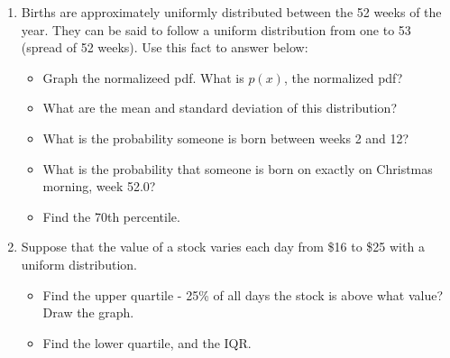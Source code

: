 \documentclass{article}
\begin{document}
\begin{enumerate}
\item Births are approximately uniformly distributed between the 52 weeks of the year. They can be said to follow a uniform
distribution from one to 53 (spread of 52 weeks).  Use this fact to answer below:
\begin{itemize}
\item Graph the normalizeed pdf. What is $p(x)$, the normalized pdf? \\ \vspace{1.5cm}
\item What are the mean and standard deviation of this distribution? \\ \vspace{1cm}
\item What is the probability someone is born between weeks 2 and 12? \\ \vspace{1cm}
\item What is the probability that someone is born on exactly on Christmas morning, week 52.0? \\ \vspace{1cm}
\item Find the 70th percentile. \\ \vspace{1cm}
\end{itemize}
\item Suppose that the value of a stock varies each day from \$16 to \$25 with a uniform distribution.
\begin{itemize}
\item Find the upper quartile - 25\% of all days the stock is above what value? Draw the graph. \\ \vspace{1.5cm}
\item Find the lower quartile, and the IQR.
\end{itemize}
\end{enumerate}
\end{document}
